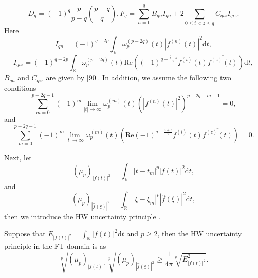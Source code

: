 \documentclass[preprint,12pt]{elsarticle}
\begin{document}
\begin{equation}
D_q = (-1)^q \frac{p}{p-q}\binom{p-q}{q}, F_q = \sum_{n=0}^q B_{qn} I_{qn} +2\sum_{0 \leq i < z \leq q} C_{qiz} I_{qiz}.%
\end{equation}
Here
\begin{equation}
I_{qn} = (-1)^{q-2p} \int_{\mathbb{R}} \omega_p^{(p-2q)} (t) \left| f^{(n)} (t) \right|^2 \mathrm{d}t, %
\end{equation}
\begin{equation}
I_{qiz} = (-1)^{q-2p} \int_{\mathbb{R}} \omega_p^{(p-2q)} (t) \mathrm{Re} \left((-1)^{q - \frac{i + z}{2}}  f^{(i)}(t) \overline{f^{(z)} (t)} \right) \mathrm{d}t, %
\end{equation}
$B_{qn}$ and $C_{qiz} $ are given by \eqref{90}. 
In addition, we assume the following two conditions
\begin{equation}
\sum_{m=0}^{p-2q-1} (-1)^m \lim_{\left| t \right| \rightarrow \infty} \omega_p^{(m)} (t) \left( \left|f^{(n)} (t)\right|^2 \right) ^{p-2q-m-1} =0,
\end{equation}
and
\begin{equation}
\sum_{m=0}^{p-2q-1} (-1)^m \lim_{\left|t \right| \rightarrow \infty} \omega_p^{(m)} (t) \left( \mathrm{Re} (-1)^{q-\frac{i+z}{2}} f^{(i)} (t) \overline{f^{(z)} (t)} \right) =0.
\end{equation}

Next, let
\begin{equation}
\label{92}
(\mu_{p})_{\left| f(t) \right|^2}=\int_{\mathbb{R}} \left| t-t_m \right|^{p} \left| f(t) \right|^2 \mathrm{d}t,
\end{equation}
and
\begin{equation}
\label{100}
(\mu_{p})_{\left| \hat{f}(\xi) \right|^2}=\int_{\mathbb{R}} \left| \xi-\xi_m \right|^{p} \left| \hat{f}(\xi) \right|^2 \mathrm{d}t,
\end{equation}
then we introduce the HW uncertainty principle \cite{HW}.

Suppose that $E_{\left| f(t) \right|^2} = \int_{\mathbb{R}} \left| f(t) \right|^{2} \mathrm{d}t$ and $p \ge 2$, then the HW uncertainty principle in the FT domain is as
\begin{equation}
\label{30}
\sqrt[p]{(\mu_{p})_{\left| f(t) \right|^2}} \sqrt[p]{(\mu_{p})_{\left| \hat{f}(\xi) \right|^2}} \ge \frac{1}{4 \pi} \sqrt[p]{E_{\left| f(t) \right|^2}^2}.
\end{equation}
\end{document}
